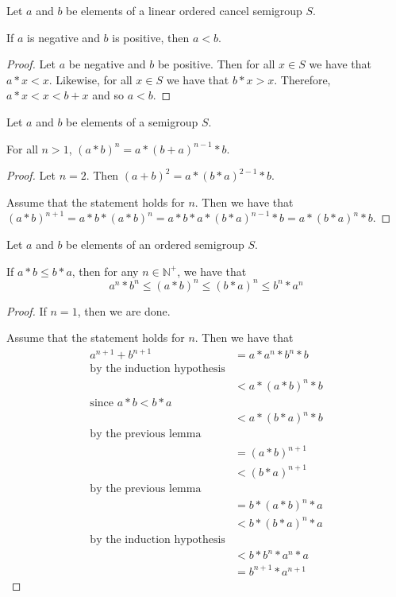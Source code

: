 \begin{theorem}\label{thm:neg_lt_pos}\leanok
{}
Let $a$ and $b$ be elements of a linear ordered cancel semigroup $S$.

If $a$ is negative and $b$ is positive, then $a < b$.
\end{theorem}
\begin{proof}
Let $a$ be negative and $b$ be positive. Then for all $x\in S$ we have that $a * x < x$.
Likewise, for all $x\in S$ we have that $b * x > x$.
Therefore, $a * x < x < b + x$ and so $a < b$.
\end{proof}

\begin{lemma}\label{split_first_and_last}\leanok
Let $a$ and $b$ be elements of a semigroup $S$.

For all $n > 1$, $(a*b)^n = a * (b+a)^{n-1} * b$.
\end{lemma}
\begin{proof}
Let $n=2$. Then $(a+b)^2 = a * (b*a)^{2-1} * b$.

Assume that the statement holds for $n$.
Then we have that $(a*b)^{n+1} = a * b * (a*b)^n = a * b * a * (b*a)^{n-1} * b = a * (b*a)^n * b$.
\end{proof}

\begin{lemma}\label{thm:comm_ineq}\leanok
Let $a$ and $b$ be elements of an ordered semigroup $S$.

If $a * b \le b * a$, then for any $n\in \mathbb{N}^+$, we have that
\[a^n * b^n \le (a*b)^n \le (b*a)^n \le b^n * a^n\]
\end{lemma}
\begin{proof}
If $n=1$, then we are done.

Assume that the statement holds for $n$.
Then we have that
\begin{align}
a^{n+1} + b^{n+1} &= a * a^n * b^n * b \\
\text{by the induction hypothesis}\\
&< a * (a * b)^n * b \\
\text{since $a*b < b*a$}\\
&< a * (b * a)^n * b \\
\text{by the previous lemma}\\
&= (a * b)^{n+1} \\
&< (b * a)^{n+1} \\
\text{by the previous lemma}\\
&= b * (a * b)^n * a \\
&< b * (b * a)^n * a \\
\text{by the induction hypothesis}\\
&< b * b^n * a^n * a \\
&= b^{n+1} * a^{n+1}
\end{align}
\end{proof}

